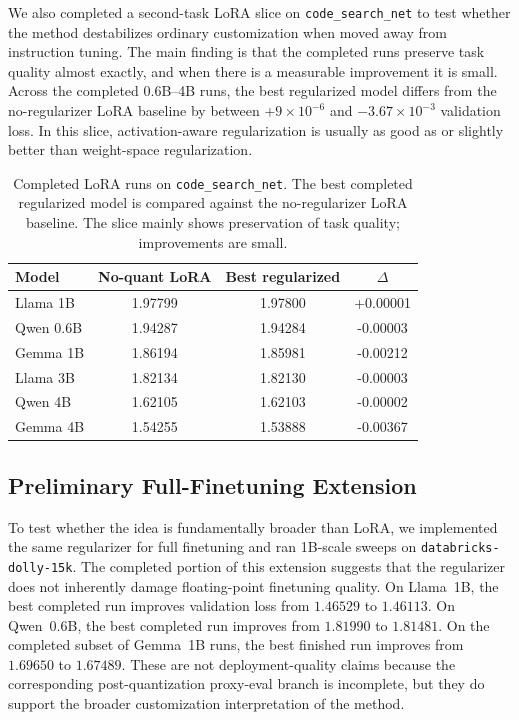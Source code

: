 \documentclass[11pt]{article}
\begin{document}
We also completed a second-task LoRA slice on \texttt{code\_search\_net} to test whether the method destabilizes ordinary customization when moved away from instruction tuning. The main finding is that the completed runs preserve task quality almost exactly, and when there is a measurable improvement it is small. Across the completed 0.6B--4B runs, the best regularized model differs from the no-regularizer LoRA baseline by between $+9\times 10^{-6}$ and $-3.67\times 10^{-3}$ validation loss. In this slice, activation-aware regularization is usually as good as or slightly better than weight-space regularization.

\begin{table}[t]
\centering
\small
\begin{tabular}{lccc}
\toprule
Model & No-quant LoRA & Best regularized & $\Delta$ \\
\midrule
Llama 1B & 1.97799 & 1.97800 & +0.00001 \\
Qwen 0.6B & 1.94287 & 1.94284 & -0.00003 \\
Gemma 1B & 1.86194 & 1.85981 & -0.00212 \\
Llama 3B & 1.82134 & 1.82130 & -0.00003 \\
Qwen 4B & 1.62105 & 1.62103 & -0.00002 \\
Gemma 4B & 1.54255 & 1.53888 & -0.00367 \\
\bottomrule
\end{tabular}
\caption{Completed LoRA runs on \texttt{code\_search\_net}. The best completed regularized model is compared against the no-regularizer LoRA baseline. The slice mainly shows preservation of task quality; improvements are small.}
\label{tab:code-robustness}
\end{table}

\subsection{Preliminary Full-Finetuning Extension}

To test whether the idea is fundamentally broader than LoRA, we implemented the same regularizer for full finetuning and ran 1B-scale sweeps on \texttt{databricks-dolly-15k}. The completed portion of this extension suggests that the regularizer does not inherently damage floating-point finetuning quality. On Llama~1B, the best completed run improves validation loss from $1.46529$ to $1.46113$. On Qwen~0.6B, the best completed run improves from $1.81990$ to $1.81481$. On the completed subset of Gemma~1B runs, the best finished run improves from $1.69650$ to $1.67489$. These are not deployment-quality claims because the corresponding post-quantization proxy-eval branch is incomplete, but they do support the broader customization interpretation of the method.
\end{document}
